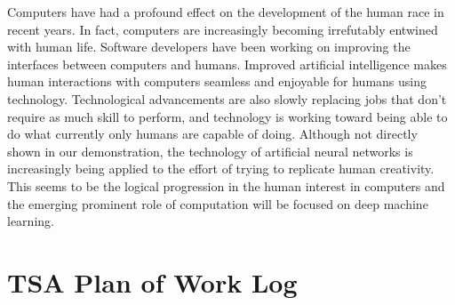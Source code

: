 \documentclass[letterpaper, 10pt]{article}
\begin{document}
	Computers have had a profound effect on the development of the human race in recent years. In fact, computers are increasingly becoming irrefutably entwined with human life. Software developers have been working on improving the interfaces between computers and humans. Improved artificial intelligence makes human interactions with computers seamless and enjoyable for humans using technology. Technological advancements are also slowly replacing jobs that don't require as much skill to perform, and technology is working toward being able to do what currently only humans are capable of doing. Although not directly shown in our demonstration, the technology of artificial neural networks is increasingly being applied to the effort of trying to replicate human creativity. This seems to be the logical progression in the human interest in computers and the emerging prominent role of computation will be focused on deep machine learning.
	
\cleardoublepage
\section{TSA Plan of Work Log}
	
\end{document}
